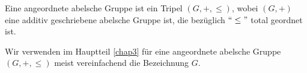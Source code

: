 
%
\begin{defn} %
Eine angeordnete abelsche Gruppe ist ein Tripel $\left(G, +, \leq\right)$, wobei $\left(G, +\right)$ eine additiv geschriebene abelsche Gruppe ist, die bezüglich $``\leq "$ total geordnet ist.
\end{defn}
%
%
%
%
\begin{nota}
Wir verwenden im Hauptteil \ref{chap3} für eine angeordnete abelsche Gruppe $\left(G, +, \leq\right)$ meist vereinfachend die Bezeichnung $G$.
\end{nota}

